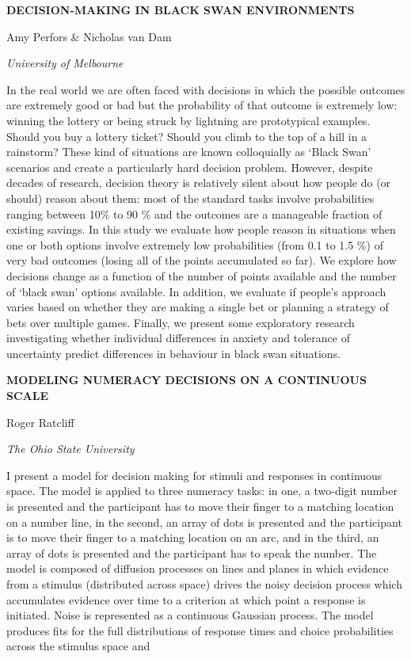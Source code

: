 \documentclass[]{article}
\begin{document}
\textbf{DECISION-MAKING IN BLACK SWAN ENVIRONMENTS}

Amy Perfors \& Nicholas van Dam

\emph{University of Melbourne}

In the real world we are often faced with decisions in which the
possible outcomes are extremely good or bad but the probability of that
outcome is extremely low: winning the lottery or being struck by
lightning are prototypical examples. Should you buy a lottery ticket?
Should you climb to the top of a hill in a rainstorm? These kind of
situations are known colloquially as `Black Swan' scenarios and create a
particularly hard decision problem. However, despite decades of
research, decision theory is relatively silent about how people do (or
should) reason about them: most of the standard tasks involve
probabilities ranging between 10\% to 90 \% and the outcomes are a
manageable fraction of existing savings. In this study we evaluate how
people reason in situations when one or both options involve extremely
low probabilities (from 0.1 to 1.5 \%) of very bad outcomes (losing all
of the points accumulated so far). We explore how decisions change as a
function of the number of points available and the number of `black
swan' options available. In addition, we evaluate if people's approach
varies based on whether they are making a single bet or planning a
strategy of bets over multiple games. Finally, we present some
exploratory research investigating whether individual differences in
anxiety and tolerance of uncertainty predict differences in behaviour in
black swan situations.

\textbf{MODELING NUMERACY DECISIONS ON A CONTINUOUS SCALE}

Roger Ratcliff

\emph{The Ohio State University}

I present a model for decision making for stimuli and responses in
continuous space. The model is applied to three numeracy tasks: in one,
a two-digit number is presented and the participant has to move their
finger to a matching location on a number line, in the second, an array
of dots is presented and the participant is to move their finger to a
matching location on an arc, and in the third, an array of dots is
presented and the participant has to speak the number. The model is
composed of diffusion processes on lines and planes in which evidence
from a stimulus (distributed across space) drives the noisy decision
process which accumulates evidence over time to a criterion at which
point a response is initiated. Noise is represented as a continuous
Gaussian process. The model produces fits for the full distributions of
response times and choice probabilities across the stimulus space and
\end{document}
